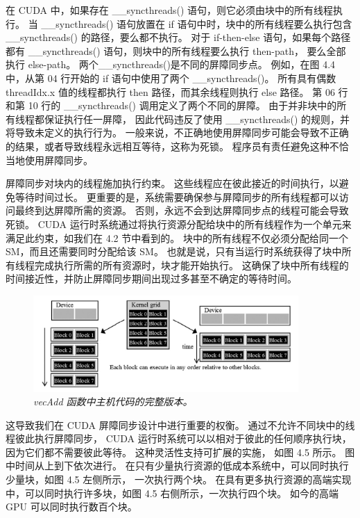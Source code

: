 在 CUDA 中，如果存在 \_\_syncthreads() 语句，则它必须由块中的所有线程执行。 
当 \_\_syncthreads() 语句放置在 if 语句中时，块中的所有线程要么执行包含 \_\_syncthreads() 的路径，要么都不执行。 
对于 if-then-else 语句，如果每个路径都有 \_\_syncthreads() 语句，则块中的所有线程要么执行 then-path，
要么全部执行 else-path。 两个\_\_syncthreads()是不同的屏障同步点。 
例如，在图 4.4 中，从第 04 行开始的 if 语句中使用了两个 \_\_syncthreads()。
所有具有偶数 threadIdx.x 值的线程都执行 then 路径，而其余线程则执行 else 路径。 
第 06 行和第 10 行的 \_\_syncthreads() 调用定义了两个不同的屏障。 由于并非块中的所有线程都保证执行任一屏障，
因此代码违反了使用 \_\_syncthreads() 的规则，并将导致未定义的执行行为。 
一般来说，不正确地使用屏障同步可能会导致不正确的结果，或者导致线程永远相互等待，这称为死锁。 
程序员有责任避免这种不恰当地使用屏障同步。

屏障同步对块内的线程施加执行约束。 这些线程应在彼此接近的时间执行，以避免等待时间过长。 
更重要的是，系统需要确保参与屏障同步的所有线程都可以访问最终到达屏障所需的资源。 
否则，永远不会到达屏障同步点的线程可能会导致死锁。 
CUDA 运行时系统通过将执行资源分配给块中的所有线程作为一个单元来满足此约束，如我们在 4.2 节中看到的。 
块中的所有线程不仅必须分配给同一个 SM，而且还需要同时分配给该 SM。 
也就是说，只有当运行时系统获得了块中所有线程完成执行所需的所有资源时，块才能开始执行。 
这确保了块中所有线程的时间接近性，并防止屏障同步期间出现过多甚至不确定的等待时间。

\begin{figure}[H]
	\centering
	\includegraphics[width=0.9\textwidth]{figs/F4.5.png}
	\caption{\textit{\color{red} vecAdd 函数中主机代码的完整版本。}}
\end{figure}

这导致我们在 CUDA 屏障同步设计中进行重要的权衡。 通过不允许不同块中的线程彼此执行屏障同步，
CUDA 运行时系统可以以相对于彼此的任何顺序执行块，因为它们都不需要彼此等待。 这种灵活性支持可扩展的实施，
如图 4.5 所示。 图中时间从上到下依次进行。 在只有少量执行资源的低成本系统中，可以同时执行少量块，如图 4.5 左侧所示，
一次执行两个块。 在具有更多执行资源的高端实现中，可以同时执行许多块，如图 4.5 右侧所示，一次执行四个块。 
如今的高端 GPU 可以同时执行数百个块。

